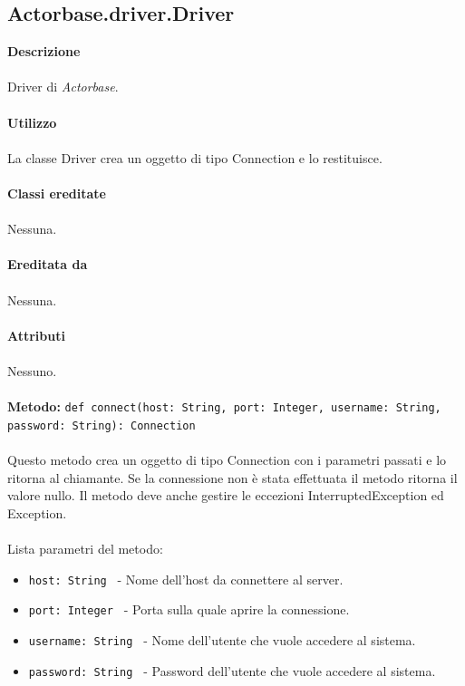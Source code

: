 \documentclass[a4paper]{article}
\begin{document}
	\subsection{Actorbase.driver.Driver}	
		\textbf{Descrizione}
			\\ \\
			Driver di \emph{Actorbase}.
			\\ \\
		\textbf{Utilizzo}
			\\ \\
			La classe Driver crea un oggetto di tipo Connection e lo restituisce.
			\\ \\
		\textbf{Classi ereditate}
			\\ \\
			Nessuna.
			\\ \\
		\textbf{Ereditata da}
			\\ \\
			Nessuna.
			\\ \\
		\textbf{Attributi}
			\\ \\
			Nessuno.
			\\ \\
		\textbf{Metodo: }\texttt{def connect(host: String, port: Integer, username: String, password: String): Connection}
			\\ \\
			Questo metodo crea un oggetto di tipo Connection con i parametri passati e lo ritorna al chiamante. Se la connessione non è stata effettuata il metodo ritorna il valore nullo.
			Il metodo deve anche gestire le eccezioni InterruptedException ed Exception.
			\\ \\
			Lista parametri del metodo:
			\begin{itemize}
				\item \texttt{host: String } - Nome dell'host da connettere al server.
				\item \texttt{port: Integer } - Porta sulla quale aprire la connessione.
				\item \texttt{username: String } - Nome dell'utente che vuole accedere al sistema.
				\item \texttt{password: String } - Password dell'utente che vuole accedere al sistema.
			\end{itemize}
			
	\newpage
	
\end{document}
